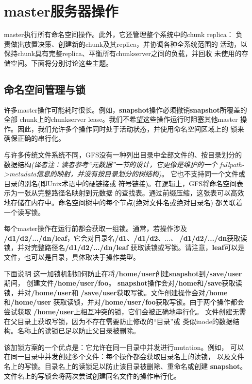 \section{master服务器操作}
master执行所有命名空间操作。此外，它还管理整个系统中的chunk replica：
负责做出放置决策、创建新的chunk及其replica，并协调各种全系统范围的
活动，以保持chunk具有完整replica、平衡所有chunkserver之间的负载，并回收
未使用的存储空间。下面将分别讨论这些主题。

\subsection{命名空间管理与锁}
许多master操作可能耗时很长。例如，\textbf{snapshot}操作必须撤销\textbf{snapshot}所覆盖的全部
chunk上的chunkserver lease。我们不希望这些操作运行时阻塞其他master
操作。因此，我们允许多个操作同时处于活动状态，并使用命名空间区域上的
锁来确保正确的串行化。

与许多传统文件系统不同，GFS没有一种列出目录中全部文件的、按目录划分的
数据结构\emph{(译者注：读者参考“元数据”一节的设计，它更像是维护的一个
fullpath->metadata信息的映射，并没有按目录划分的树结构)}。
它也不支持同一个文件或目录的别名(即Unix术语中的硬链接或
符号链接)。在逻辑上，GFS将命名空间表示为一张从完整路径名映射到元数据
的查找表。通过前缀压缩，这张表可以高效地存储在内存中。命名空间树中的每个节点(绝对文件名或绝对目录名)
都关联着一个读写锁。

每个master操作在运行前都会获取一组锁。通常，若操作涉及
\textbf{/d1/d2/.../dn/leaf}，它会对目录名\textbf{/d1}、\textbf{/d1/d2}、...、
\textbf{/d1/d2/.../dn}获取读锁，并对完整路径名\textbf{/d1/d2/.../dn/leaf}
获取读锁或写锁。请注意，\textbf{leaf}可以是文件，也可以是目录，具体取决于操作类型。

下面说明
这一加锁机制如何防止在将\textbf{/home/user}创建\textbf{snapshot}到\textbf{/save/user}期间，
创建文件\textbf{/home/user/foo}。
\textbf{snapshot}操作会对\textbf{/home}和\textbf{/save}获取读锁，并对\textbf{/home/user}和
\textbf{/save/user}获取写锁。文件创建操作会对\textbf{/home}和\textbf{/home/user}
获取读锁，并对\textbf{/home/user/foo}获取写锁。由于两个操作都会尝试获取
\textbf{/home/user}上相互冲突的锁，它们会被正确地串行化。
文件创建无需在父目录上获取写锁，因为不存在需要防止修改的“目录”或
类似inode的数据结构。名称上的读锁已足以防止父目录被删除。

该加锁方案的一个优点是：它允许在同一目录中并发进行mutation。例如，
可以在同一目录中并发创建多个文件：每个操作都会获取目录名上的读锁，
以及文件名上的写锁。目录名上的读锁足以防止该目录被删除、重命名或创建
\textbf{snapshot}。文件名上的写锁会将两次尝试创建同名文件的操作串行化。

